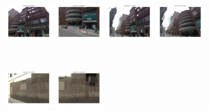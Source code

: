 \begin{figure}[h]
\begin{minipage}{0.34\linewidth}
        \end{minipage}
        \begin{minipage}{0.75\linewidth}
            \begin{minipage}{\linewidth} 
                \colorbox{myGreen}{\includegraphics[trim = 35mm 30mm 35mm 30mm, clip=true, height=16mm]{imgs/Pval/exImproved04/improvedPval01.jpg}}
                \colorbox{myGreen}{\includegraphics[trim = 35mm 30mm 35mm 30mm, clip=true, height=16mm]{imgs/Pval/exImproved04/improvedPval02.jpg}}
                \colorbox{myGreen}{\includegraphics[trim = 35mm 30mm 35mm 30mm, clip=true, height=16mm]{imgs/Pval/exImproved04/improvedPval03.jpg}}
                \colorbox{myGreen}{\includegraphics[trim = 35mm 30mm 35mm 30mm, clip=true, height=16mm]{imgs/Pval/exImproved04/improvedPval04.jpg}}
            \end{minipage}
            \\
            \begin{minipage}{\linewidth}
                \colorbox{myRed}{\includegraphics[trim = 35mm 30mm 35mm 30mm, clip=true, height=16mm]{imgs/Pval/exImproved04/improved01.jpg}}
                \colorbox{myRed}{\includegraphics[trim = 35mm 30mm 35mm 30mm, clip=true, height=16mm]{imgs/Pval/exImproved04/improved02.jpg}}

\end{minipage}
\end{minipage}
\end{figure}
